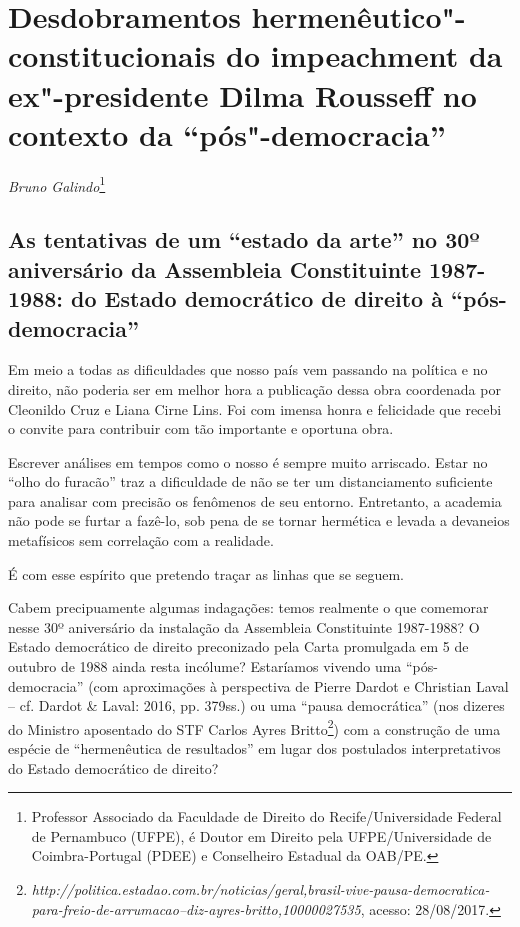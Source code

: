 \chapter{Desdobramentos hermenêutico"-constitucionais do
impeachment da ex"-presidente Dilma Rousseff no contexto da
``pós"-democracia''}

\begin{flushright}
\emph{Bruno Galindo}\footnote{Professor Associado da Faculdade de Direito do Recife/Universidade
Federal de Pernambuco (UFPE), é
Doutor em Direito pela UFPE/Universidade de Coimbra-Portugal
(PDEE) e Conselheiro Estadual da OAB/PE.}
\end{flushright}


 \section{As tentativas de um ``estado da arte'' no 30º aniversário da
  Assembleia Constituinte 1987-1988: do Estado democrático de direito à
  ``pós-democracia''}


Em meio a todas as dificuldades que nosso país vem passando na política
e no direito, não poderia ser em melhor hora a publicação dessa obra
coordenada por Cleonildo Cruz e Liana Cirne Lins. Foi com imensa honra e
felicidade que recebi o convite para contribuir com tão importante e
oportuna obra.

Escrever análises em tempos como o nosso é sempre muito arriscado. Estar
no ``olho do furacão'' traz a dificuldade de não se ter um
distanciamento suficiente para analisar com precisão os fenômenos de seu
entorno. Entretanto, a academia não pode se furtar a fazê-lo, sob pena
de se tornar hermética e levada a devaneios metafísicos sem correlação
com a realidade.

É com esse espírito que pretendo traçar as linhas que se seguem.

Cabem precipuamente algumas indagações: temos realmente o que comemorar
nesse 30º aniversário da instalação da Assembleia Constituinte
1987-1988? O Estado democrático de direito preconizado pela Carta
promulgada em 5 de outubro de 1988 ainda resta incólume? Estaríamos
vivendo uma ``pós-democracia'' (com aproximações à perspectiva de Pierre
Dardot e Christian Laval -- cf. Dardot \& Laval: 2016, pp. 379ss.) ou
uma ``pausa democrática'' (nos dizeres do Ministro aposentado do STF
Carlos Ayres Britto\footnote{\emph{http://politica.estadao.com.br/noticias/geral,brasil-vive-pausa-democratica-para-freio-de-arrumacao--diz-ayres-britto,10000027535},
  acesso: 28/08/2017.}) com a construção de uma espécie de
``hermenêutica de resultados'' em lugar dos postulados interpretativos
do Estado democrático de direito?

